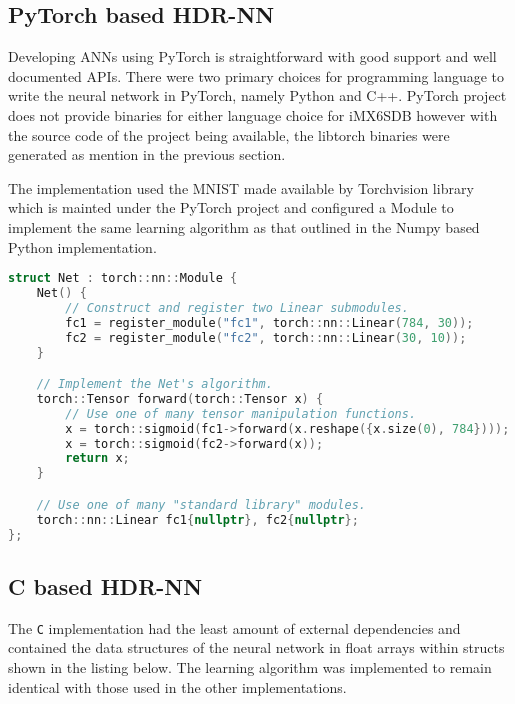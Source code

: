 

\subsection{PyTorch based HDR-NN}

Developing ANNs using PyTorch is straightforward with good support and well documented APIs. There were two primary choices for programming language to write the neural network in PyTorch, namely Python and C++. PyTorch project does not provide binaries for either language choice for iMX6SDB however with the source code of the project being available, the libtorch binaries were generated as mention in the previous section.

The implementation used the MNIST made available by Torchvision library which is mainted under the PyTorch project and configured a Module to implement the same learning algorithm as that outlined in the Numpy based Python implementation.

\begin{lstlisting}[language=C++]
struct Net : torch::nn::Module {
	Net() {
		// Construct and register two Linear submodules.
		fc1 = register_module("fc1", torch::nn::Linear(784, 30));
		fc2 = register_module("fc2", torch::nn::Linear(30, 10));
	}

	// Implement the Net's algorithm.
	torch::Tensor forward(torch::Tensor x) {
		// Use one of many tensor manipulation functions.
		x = torch::sigmoid(fc1->forward(x.reshape({x.size(0), 784})));
		x = torch::sigmoid(fc2->forward(x));
		return x;
	}

	// Use one of many "standard library" modules.
	torch::nn::Linear fc1{nullptr}, fc2{nullptr};
};
\end{lstlisting}


\subsection{C based HDR-NN}

The \texttt{C} implementation had the least amount of external dependencies and contained the data structures of the neural network in float arrays within structs shown in the listing below. The learning algorithm was implemented to remain identical with those used in the other implementations.

